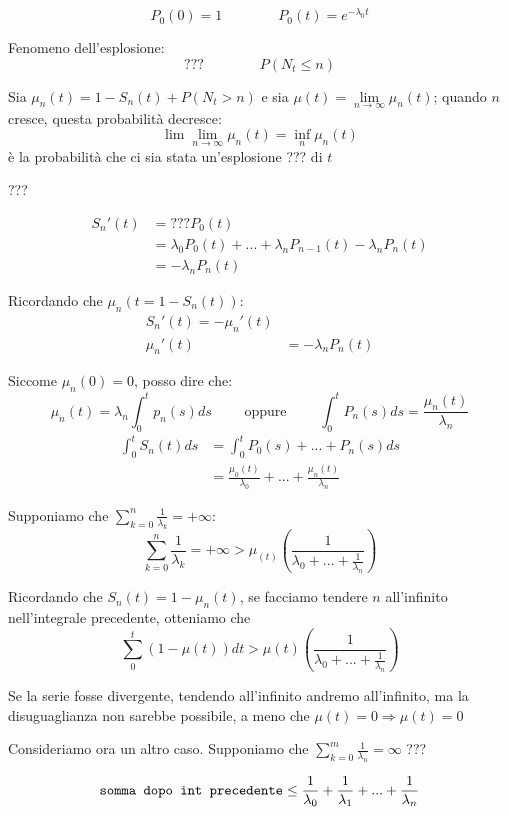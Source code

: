 \documentclass[a4paper,12pt]{book}
\begin{document}
$$ P_0(0) = 1 \qquad \qquad P_0(t) = e^{-\lambda_0 t} $$

Fenomeno dell'esplosione:
$$ ??? \qquad \qquad P(N_t \le n)$$ %

Sia $ \mu_n(t) = 1 - S_n(t) + P(N_t > n) $ e sia $\mu(t) = \lim\limits_{n \to \infty} \mu_n(t)$; quando $ n $ cresce, questa probabilità decresce:
$$ \lim\lim\limits_{n \to \infty} \mu_n(t) = \underset{n}{\inf} \mu_n(t) $$
 è la probabilità che ci sia stata un'esplosione ??? di $ t $ %

??? %

\begin{align*}
	S_n'(t) & = ??? P_0(t) \\ %
	& = \lambda_0P_0(t) + ... + \lambda_nP_{n-1}(t) - \lambda_n P_n(t) \\
	& = -\lambda_nP_n(t)
\end{align*}

Ricordando che $ \mu_n(t = 1 - S_n(t)) $:
\begin{align*}
	S_n'(t) = - \mu_n' (t) \\
	\mu_n'(t) & = -\lambda_nP_n(t)
\end{align*}

Siccome $\mu_n(0) = 0$, posso dire che:
$$ \mu_n(t) = \lambda_n \int_{0}^{t}p_n(s) ds \qquad \text{ oppure } \qquad \int_{0}^{t}P_n(s)ds = \frac{\mu_n(t)}{\lambda_n} $$
\begin{align*}
	\int_{0}^{t} S_n(t)ds  & = \int_{0}^{t}P_0(s) + ... + P_n(s) ds \\
	& = \frac{\mu_0(t)}{\lambda_0} + ... + \frac{\mu_n(t)}{\lambda_n}
\end{align*}

Supponiamo che $ \sum_{k=0}^{n} \frac{1}{\lambda_k} = +\infty $:
$$ \sum_{k=0}^{n} \frac{1}{\lambda_k} = +\infty > \mu_(t) (\frac{1}{\lambda_0 + ... + \frac{1}{\lambda_n}})$$

Ricordando che $ S_n(t) = 1 - \mu_n(t) $, se facciamo tendere $ n $ all'infinito nell'integrale precedente, otteniamo che 
$$ \sum_{0}^{t} (1 - \mu(t)) dt > \mu(t) (\frac{1}{\lambda_0 + ... + \frac{1}{\lambda_n}}) $$

Se la serie fosse divergente, tendendo all'infinito andremo all'infinito, ma la disuguaglianza non sarebbe possibile, a meno che $ \mu(t) = 0 \Rightarrow \mu(t) = 0 $ %

Consideriamo ora un altro caso. Supponiamo che $ \sum_{k=0}^{m} \frac{1}{\lambda_n} = \infty $ ??? %

$$ \text{\texttt{somma dopo int precedente}} \le \frac{1}{\lambda_0} + \frac{1}{\lambda_1} + ... + \frac{1}{\lambda_n} $$ %
\end{document}
